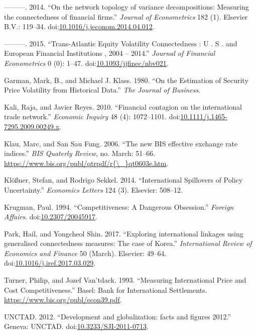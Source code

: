 \documentclass[]{elsarticle} %
\begin{document}
\hypertarget{ref-Diebold2014}{}
---------. 2014. ``On the network topology of variance decompositions:
Measuring the connectedness of financial firms.'' \emph{Journal of
Econometrics} 182 (1). Elsevier B.V.: 119--34.
doi:\href{https://doi.org/10.1016/j.jeconom.2014.04.012}{10.1016/j.jeconom.2014.04.012}.

\hypertarget{ref-Diebold2015}{}
---------. 2015. ``Trans-Atlantic Equity Volatility Connectedness : U .
S . and European Financial Institutions , 2004 -- 2014.'' \emph{Journal
of Financial Econometrics} 0 (0): 1--47.
doi:\href{https://doi.org/10.1093/jjfinec/nbv021}{10.1093/jjfinec/nbv021}.

\hypertarget{ref-Garman1980}{}
Garman, Mark, B., and Michael J. Klass. 1980. ``On the Estimation of
Security Price Volatility from Historical Data.'' \emph{The Journal of
Business}.

\hypertarget{ref-Kali2010}{}
Kali, Raja, and Javier Reyes. 2010. ``Financial contagion on the
international trade network.'' \emph{Economic Inquiry} 48 (4):
1072--1101.
doi:\href{https://doi.org/10.1111/j.1465-7295.2009.00249.x}{10.1111/j.1465-7295.2009.00249.x}.

\hypertarget{ref-Klau2006}{}
Klau, Marc, and San Sau Fung. 2006. ``The new BIS effective exchange
rate indices.'' \emph{BIS Quaterly Review}, no. March: 51--66.
\href{https://www.bis.org/publ/qtrpdf/r\%7B/_\%7Dqt0603e.htm}{https://www.bis.org/publ/qtrpdf/r\{\textbackslash{}\_\}qt0603e.htm}.

\hypertarget{ref-klossner2014international}{}
Klößner, Stefan, and Rodrigo Sekkel. 2014. ``International Spillovers of
Policy Uncertainty.'' \emph{Economics Letters} 124 (3). Elsevier:
508--12.

\hypertarget{ref-Krugman1994}{}
Krugman, Paul. 1994. ``Competitiveness: A Dangerous Obsession.''
\emph{Foreign Affairs}.
doi:\href{https://doi.org/10.2307/20045917}{10.2307/20045917}.

\hypertarget{ref-Park2017}{}
Park, Hail, and Yongcheol Shin. 2017. ``Exploring international linkages
using generalised connectedness measures: The case of Korea.''
\emph{International Review of Economics and Finance} 50 (March).
Elsevier: 49--64.
doi:\href{https://doi.org/10.1016/j.iref.2017.03.029}{10.1016/j.iref.2017.03.029}.

\hypertarget{ref-Turner1993}{}
Turner, Philip, and Jozef Van'tdack. 1993. ``Measuring International
Price and Cost Competitiveness.'' Basel: Bank for International
Settlements. \url{https://www.bis.org/publ/econ39.pdf}.

\hypertarget{ref-UNCTAD2012}{}
UNCTAD. 2012. ``Development and globalization: facts and figures 2012.''
Geneva: UNCTAD.
doi:\href{https://doi.org/10.3233/SJI-2011-0713}{10.3233/SJI-2011-0713}.
\end{document}
